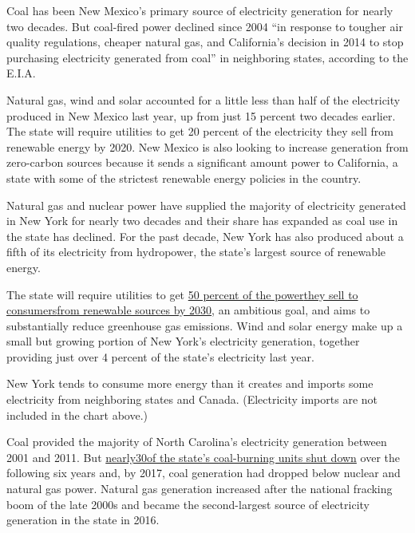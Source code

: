 Coal has been New Mexico's primary source of electricity generation for
nearly two decades. But coal-fired power declined since 2004 ``in
response to tougher air quality regulations, cheaper natural gas, and
California's decision in 2014 to stop purchasing electricity generated
from coal'' in neighboring states, according to the E.I.A.

Natural gas, wind and solar accounted for a little less than half of the
electricity produced in New Mexico last year, up from just 15 percent
two decades earlier. The state will require utilities to get 20 percent
of the electricity they sell from renewable energy by 2020. New Mexico
is also looking to increase generation from zero-carbon sources because
it sends a significant amount power to California, a state with some of
the strictest renewable energy policies in the country.

Natural gas and nuclear power have supplied the majority of electricity
generated in New York for nearly two decades and their share has
expanded as coal use in the state has declined. For the past decade, New
York has also produced about a fifth of its electricity from hydropower,
the state's largest source of renewable energy.

The state will require utilities to get
\href{https://www.nytimes3xbfgragh.onion/2015/11/23/nyregion/gov-cuomo-to-order-large-increase-in-renewable-energy-in-new-york-by-2030.html?module=inline}{50
percent of the
power}\href{https://www.nytimes3xbfgragh.onion/2015/11/23/nyregion/gov-cuomo-to-order-large-increase-in-renewable-energy-in-new-york-by-2030.html?module=inline}{they
sell to
consumers}\href{https://www.nytimes3xbfgragh.onion/2015/11/23/nyregion/gov-cuomo-to-order-large-increase-in-renewable-energy-in-new-york-by-2030.html?module=inline}{from
renewable sources by 2030}, an ambitious goal, and aims to substantially
reduce greenhouse gas emissions. Wind and solar energy make up a small
but growing portion of New York's electricity generation, together
providing just over 4 percent of the state's electricity last year.

New York tends to consume more energy than it creates and imports some
electricity from neighboring states and Canada. (Electricity imports are
not included in the chart above.)

Coal provided the majority of North Carolina's electricity generation
between 2001 and 2011. But
\href{https://www.eia.gov/state/analysis.php?sid=NC}{nearly}\href{https://www.eia.gov/state/analysis.php?sid=NC}{30}\href{https://www.eia.gov/state/analysis.php?sid=NC}{of
the state's coal-burning units shut down} over the following six years
and, by 2017, coal generation had dropped below nuclear and natural gas
power. Natural gas generation increased after the national fracking boom
of the late 2000s and became the second-largest source of electricity
generation in the state in 2016.

